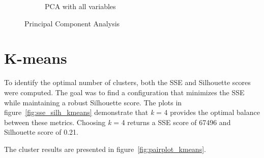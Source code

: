 \begin{figure}[h]
\begin{subfigure}[b]{0.40\textwidth}
        \caption{PCA with all variables}
        \label{fig:pca5}
    \end{subfigure}
    \caption{Principal Component Analysis}
    \label{fig:pca_diff}
\end{figure}

\section{K-means}\label{sec:centroid_based}

To identify the optimal number of clusters, both the SSE and Silhouette scores were computed. The goal was to find a configuration that minimizes the SSE while maintaining a robust Silhouette score. 
The plots in figure~\ref{fig:sse_silh_kmeans} demonstrate that \textit{k} = 4 provides the optimal balance between these metrics. Choosing \textit{k} = 4 returns a SSE score of 67496 and Silhouette score of 0.21. 

The cluster results are presented in figure~\ref{fig:pairplot_kmeans}. 

